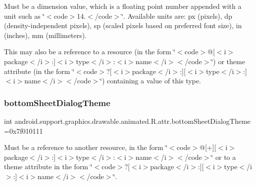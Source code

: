 Must be a dimension value, which is a floating point number appended with a unit such as \char`\"{}$<$code$>$14.\+5sp$<$/code$>$\char`\"{}. Available units are\+: px (pixels), dp (density-\/independent pixels), sp (scaled pixels based on preferred font size), in (inches), mm (millimeters). 

This may also be a reference to a resource (in the form \char`\"{}$<$code$>$@\mbox{[}$<$i$>$package$<$/i$>$\+:\mbox{]}$<$i$>$type$<$/i$>$\+:$<$i$>$name$<$/i$>$$<$/code$>$\char`\"{}) or theme attribute (in the form \char`\"{}$<$code$>$?\mbox{[}$<$i$>$package$<$/i$>$\+:\mbox{]}\mbox{[}$<$i$>$type$<$/i$>$\+:\mbox{]}$<$i$>$name$<$/i$>$$<$/code$>$\char`\"{}) containing a value of this type. \mbox{\label{classandroid_1_1support_1_1graphics_1_1drawable_1_1animated_1_1R_1_1attr_a705ff52805f048fcd8ec41d4aa96172f}} 
\subsubsection{\texorpdfstring{bottom\+Sheet\+Dialog\+Theme}{bottomSheetDialogTheme}}
{\footnotesize\ttfamily int android.\+support.\+graphics.\+drawable.\+animated.\+R.\+attr.\+bottom\+Sheet\+Dialog\+Theme =0x7f010111\hspace{0.3cm}{\ttfamily [static]}}

Must be a reference to another resource, in the form \char`\"{}$<$code$>$@\mbox{[}+\mbox{]}\mbox{[}$<$i$>$package$<$/i$>$\+:\mbox{]}$<$i$>$type$<$/i$>$\+:$<$i$>$name$<$/i$>$$<$/code$>$\char`\"{} or to a theme attribute in the form \char`\"{}$<$code$>$?\mbox{[}$<$i$>$package$<$/i$>$\+:\mbox{]}\mbox{[}$<$i$>$type$<$/i$>$\+:\mbox{]}$<$i$>$name$<$/i$>$$<$/code$>$\char`\"{}. \mbox{\label{classandroid_1_1support_1_1graphics_1_1drawable_1_1animated_1_1R_1_1attr_aeabe7907fc4c0fc017e92648db8dcacc}} 
